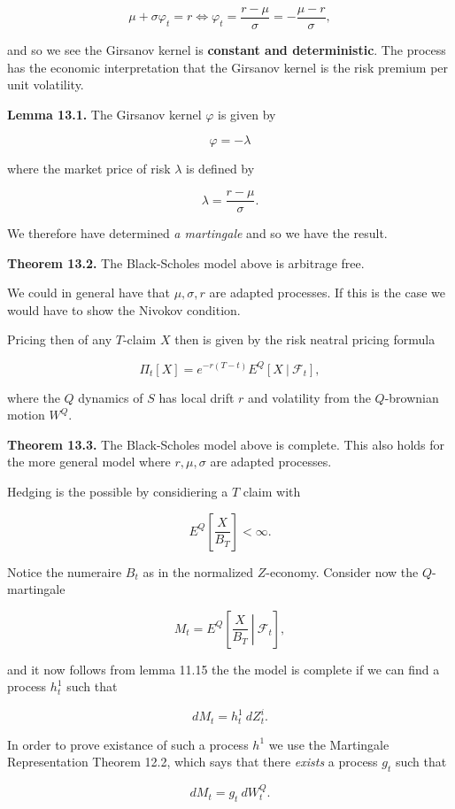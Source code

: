 \documentclass[
]{article}
\begin{document}
\[
\mu + \sigma \varphi_t=r\iff \varphi_t=\frac{r-\mu}{\sigma}=-\frac{\mu -r}{\sigma},
\]

and so we see the Girsanov kernel is \textbf{constant and
deterministic}. The process has the economic interpretation that the
Girsanov kernel is the risk premium per unit volatility.

\textbf{Lemma 13.1.} The Girsanov kernel \(\varphi\) is given by

\[
\varphi = -\lambda
\]

where the market price of risk \(\lambda\) is defined by

\[
\lambda =\frac{r-\mu}{\sigma}.
\]

We therefore have determined \emph{a martingale} and so we have the
result.

\textbf{Theorem 13.2.} The Black-Scholes model above is arbitrage free.

We could in general have that \(\mu,\sigma,r\) are adapted processes. If
this is the case we would have to show the Nivokov condition.

Pricing then of any \(T\)-claim \(X\) then is given by the risk neatral
pricing formula

\[
\Pi_t[X]=e^{-r(T-t)}E^Q[X\ \vert\ \mathcal{F}_t],
\]

where the \(Q\) dynamics of \(S\) has local drift \(r\) and volatility
from the \(Q\)-brownian motion \(W^Q\).

\textbf{Theorem 13.3.} The Black-Scholes model above is complete. This
also holds for the more general model where \(r,\mu,\sigma\) are adapted
processes.

Hedging is the possible by considiering a \(T\) claim with

\[
E^Q\left[\frac{X}{B_T}\right]<\infty.
\]

Notice the numeraire \(B_t\) as in the normalized \(Z\)-economy.
Consider now the \(Q\)-martingale

\[
M_t=E^Q\left[\left. \frac{X}{B_T}\ \right\vert\ \mathcal{F}_t\right],
\]

and it now follows from lemma 11.15 the the model is complete if we can
find a process \(h_t^1\) such that

\[
dM_t=h_t^1\ dZ_t^i.
\]

In order to prove existance of such a process \(h^1\) we use the
Martingale Representation Theorem 12.2, which says that there
\emph{exists} a process \(g_t\) such that

\[
dM_t=g_t\ dW_t^Q.
\]
\end{document}
